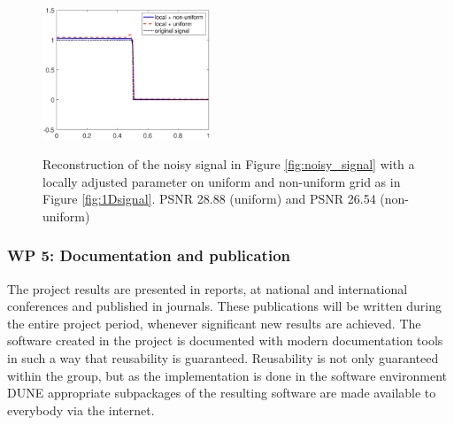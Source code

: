 \documentclass[enabledeprecatedfontcommands,cleardoublepage=empty,headsepline,twoside,11pt,DIV=15,BCOR=12mm,final]{scrartcl}
\begin{document}
\begin{figure}[h!]
\begin{center}
{\includegraphics[width=5cm]{Comparison_uniform_nonuniform_mesh_average}}
\caption{Reconstruction of the noisy signal in Figure \ref{fig:noisy_signal} with a locally adjusted parameter on uniform and non-uniform grid as in Figure \ref{fig:1Dsignal}. PSNR 28.88 (uniform) and PSNR 26.54 (non-uniform)}\label{fig:PSNR}
\end{center}
\end{figure}
 

 
 \subsubsection*{WP 5: Documentation and publication}
 
 The project results are presented in reports, at national and international conferences and published in journals. These publications will be written during the entire project period, whenever significant new results are achieved. The software created in the project is documented with modern documentation tools in such a way that reusability is guaranteed. Reusability is not only guaranteed within the group, but as the implementation is done in the software environment DUNE appropriate subpackages of the resulting software are made available to everybody via the internet.
\end{document}
